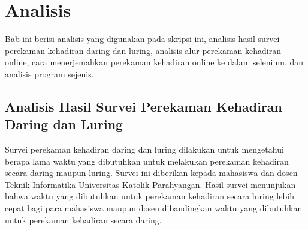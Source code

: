 \chapter{Analisis}
\label{chap:analisis}
Bab ini berisi analisis yang digunakan pada skripsi ini, analisis hasil survei perekaman kehadiran daring dan luring, analisis alur perekaman kehadiran online, cara menerjemahkan perekaman kehadiran online ke dalam selenium, dan analisis program sejenis.

\section{Analisis Hasil Survei Perekaman Kehadiran Daring dan Luring}
\label{sec:survei} 
Survei perekaman kehadiran daring dan luring dilakukan untuk mengetahui berapa lama waktu yang dibutuhkan untuk melakukan perekaman kehadiran secara daring maupun luring. Survei ini diberikan kepada mahasiswa dan dosen Teknik Informatika Universitas Katolik Parahyangan. Hasil survei menunjukan bahwa waktu yang dibutuhkan untuk perekaman kehadiran secara luring lebih cepat bagi para mahasiswa maupun dosen dibandingkan waktu yang dibutuhkan untuk perekaman kehadiran secara daring. 

